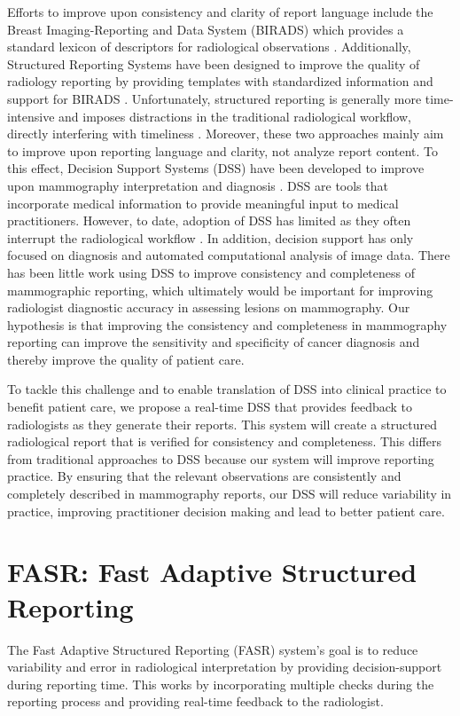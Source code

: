 Efforts to improve upon consistency and clarity of report language include the Breast Imaging-Reporting and Data System (BIRADS) which provides a standard lexicon of descriptors for radiological observations \cite{Liberman:ws}. Additionally, Structured Reporting Systems have been designed to improve the quality of radiology reporting by providing templates with standardized information and support for BIRADS \cite{Reiner:2009ib}. Unfortunately, structured reporting is generally more time-intensive and imposes distractions in the traditional radiological workflow, directly interfering with timeliness \cite{Weiss:2008er}. Moreover, these two approaches mainly aim to improve upon reporting language and clarity, not analyze report content. To this effect, Decision Support Systems (DSS) have been developed to improve upon mammography interpretation and diagnosis \cite{Garg:2005cb, Burnside:2000wl, ElizabethS:2005gc, Rubin:2005jg}. DSS are tools that incorporate medical information to provide meaningful input to medical practitioners. However, to date, adoption of DSS has limited as they often interrupt the radiological workflow \cite{Morgan:2011ct}. In addition, decision support has only focused on diagnosis and automated computational analysis of image data. There has been little work using DSS to improve consistency and completeness of mammographic reporting, which ultimately would be important for improving radiologist diagnostic accuracy in assessing lesions on mammography. Our hypothesis is that improving the consistency and completeness in mammography reporting can improve the sensitivity and specificity of cancer diagnosis and thereby improve the quality of patient care.

To tackle this challenge and to enable translation of DSS into clinical practice to benefit patient care, we propose a real-time DSS that provides feedback to radiologists as they generate their reports. This system will create a structured radiological report that is verified for consistency and completeness. This differs from traditional approaches to DSS because our system will improve reporting practice. By ensuring that the relevant observations are consistently and completely described in mammography reports, our DSS will reduce variability in practice, improving practitioner decision making and lead to better patient care.

\section{FASR: Fast Adaptive Structured Reporting}
The Fast Adaptive Structured Reporting (FASR) system's goal is to reduce variability and error in radiological interpretation by providing decision-support during reporting time. This works by incorporating multiple checks during the reporting process and providing real-time feedback to the radiologist.

